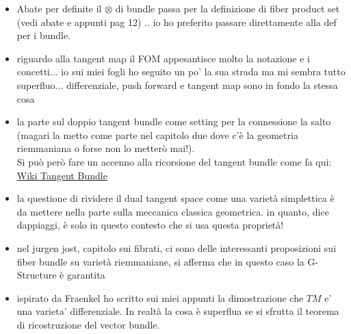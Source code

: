 \documentclass[a4paper,12pt]{scrartcl}    %
\begin{document}
\begin{itemize}
\item Abate per definite il $\otimes$ di bundle passa per la definizione di fiber product set (vedi abate e appunti pag 12) .. io ho preferito passare direttamente alla def per i bundle.

\item riguardo alla tangent map il FOM appesantisce molto la notazione e i concetti... io sui miei fogli ho seguito un po' la sua strada ma mi sembra tutto superfluo... differenziale, push forward e tangent map sono in fondo la stessa cosa

\item la parte sul doppio tangent bundle come setting per la connessione la salto (magari la metto come parte nel capitolo due dove c'è la geometria riemmaniana o forse non lo metterò mai!).
\\ Si può però fare un accenno alla ricorsione del tangent bundle come fa qui: \href{http://en.wikipedia.org/wiki/Tangent_bundle#Higher-order_tangent_bundles}{Wiki Tangent Bundle}

\item la questione di rividere il dual tangent space come una varietà simplettica è da mettere nella parte sulla meccanica classica geometrica. in quanto, dice dappiaggi, è solo in questo contesto che si usa questa proprietà!

\item nel jurgen jost, capitolo sui fibrati, ci sono delle interessanti proposizioni sui fiber bundle su varietà riemmaniane, si afferma che in questo caso la G-Structure è garantita

\item ispirato da Fraenkel ho scritto sui miei appunti la dimostrazione che $TM$ e' una varieta' differenziale. In realtà la cosa è superflua se si sfrutta il teorema di ricostruzione del vector bundle.

\end{itemize}
\end{document}
